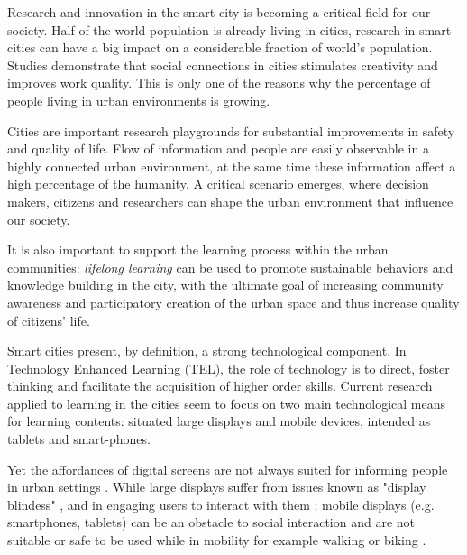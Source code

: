 Research and innovation in the smart city is becoming a critical field for our society. Half of the world population is already living in cities, research in smart cities can have a big impact on a considerable fraction of world's population.
Studies demonstrate that social connections in cities stimulates creativity and improves work quality\cite{florida_cities_2005}. This is only one of the reasons why the percentage of people living in urban environments is growing.

Cities are important research playgrounds for substantial improvements in safety and quality of life.
Flow of information and people are easily observable in a highly connected urban environment, at the same time these information affect a high percentage of the humanity. A critical scenario emerges, where decision makers, citizens and researchers can shape the urban environment that influence our society.

It is also important to support the learning process within the urban communities: \textit{lifelong learning} can be used to promote sustainable behaviors and knowledge building in the city, with the ultimate goal of increasing community awareness and participatory creation of the urban space and thus increase quality of citizens' life.

Smart cities present, by definition, a strong technological component.
In Technology Enhanced Learning (TEL), the role of technology is to direct, foster thinking and facilitate the acquisition of higher order skills\cite{goodyear_technologyenhanced_2010}.
Current research applied to learning in the cities seem to focus on two main technological means for learning contents: situated large displays and mobile devices, intended as tablets and smart-phones\cite{luff_mobility_1998}.

Yet the affordances of digital screens are not always suited for informing people in urban settings \cite{koeman}. While large displays suffer from issues known as "display blindess" \cite{}, and in engaging users to interact with them \cite{}; mobile displays (e.g. smartphones, tablets) can be an obstacle to social interaction and are not suitable or safe to be used while in mobility for example walking or biking \cite{}. 

